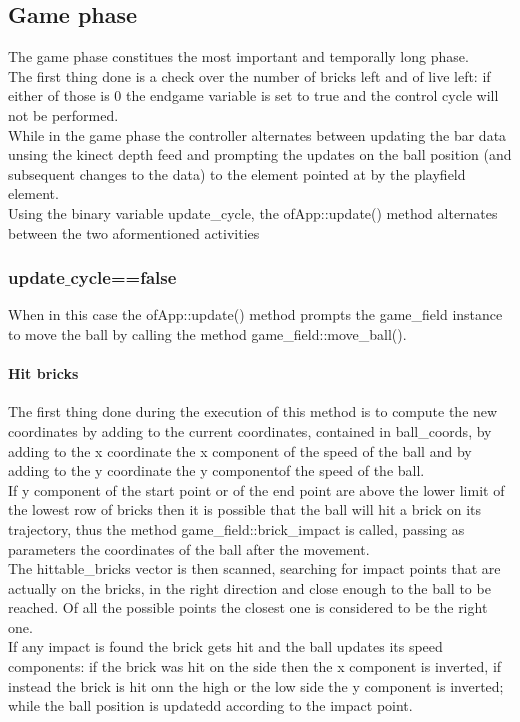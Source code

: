 \documentclass[]{article}
\begin{document}
\subsection{Game phase}
The game phase constitues the most important and temporally long phase.\\
The first thing done is a check over the number of bricks left and of live left: if either of those is 0 the endgame variable is set to true and the control cycle will not be performed.\\
While in the game phase the controller alternates between updating the bar data unsing the kinect depth feed and prompting the updates on the ball position (and subsequent changes to the data) to the element pointed at by the playfield element.\\
Using the binary variable update\_cycle, the ofApp::update() method alternates between the two aformentioned activities
\subsubsection{update$\_$cycle==false}
When in this case the ofApp::update() method prompts the game\_field instance to move the ball by calling the method game\_field::move\_ball().\\
\paragraph{Hit bricks}
The first thing done during the execution of this method is to compute the new coordinates by adding to the current coordinates, contained in ball\_coords, by adding to the x coordinate the x component of the speed of the ball and by adding to the y coordinate the y componentof the speed of the ball.\\
If y component of the start point or of the end point are above the lower limit of the lowest row of bricks then it is possible that the ball will hit a brick on its trajectory, thus the method game\_field::brick\_impact is called, passing as parameters the coordinates of the ball after the movement.\\
The hittable\_bricks vector is then scanned, searching for impact points that are actually on the bricks, in the right direction and close enough to the ball to be reached. Of all the possible points the closest one is considered to be the right one.\\
If any impact is found the brick gets hit and the ball updates its speed components: if the brick was hit on the side then the x component is inverted, if instead the brick is hit onn the high or the low side the y component is inverted; while the ball position is updatedd according to the impact point.\\
\end{document}
